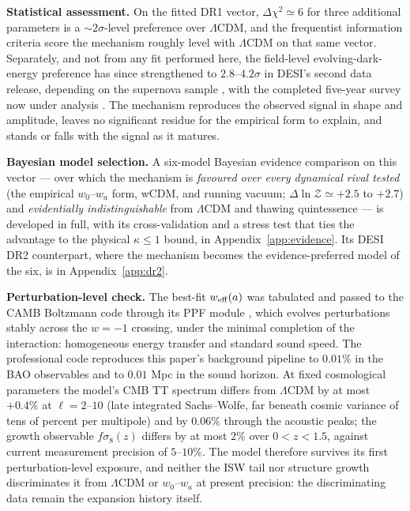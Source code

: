 \documentclass[11pt,a4paper]{article}
\newcommand{\lcdm}{\ensuremath{\Lambda}CDM}
\newcommand{\weff}{w_{\rm eff}}
\begin{document}
\textbf{Statistical assessment.} On the fitted DR1 vector, $\Delta\chi^2\simeq6$ for three additional parameters is a $\sim2\sigma$-level preference over \lcdm{}, and the frequentist information criteria score the mechanism roughly level with \lcdm{} on that same vector. Separately, and not from any fit performed here, the field-level evolving-dark-energy preference has since strengthened to $2.8$--$4.2\sigma$ in DESI's second data release, depending on the supernova sample \citep{DESI_DR2}, with the completed five-year survey now under analysis \citep{DESI_completion}. The mechanism reproduces the observed signal in shape and amplitude, leaves no significant residue for the empirical form to explain, and stands or falls with the signal as it matures.

\textbf{Bayesian model selection.} A six-model Bayesian evidence comparison on this vector --- over which the mechanism is \emph{favoured over every dynamical rival tested} (the empirical $w_0$--$w_a$ form, wCDM, and running vacuum; $\Delta\ln\mathcal{Z}\simeq+2.5$ to $+2.7$) and \emph{evidentially indistinguishable} from \lcdm{} and thawing quintessence --- is developed in full, with its cross-validation and a stress test that ties the advantage to the physical $\kappa\le1$ bound, in Appendix~\ref{app:evidence}. Its DESI DR2 counterpart, where the mechanism becomes the evidence-preferred model of the six, is in Appendix~\ref{app:dr2}.

\textbf{Perturbation-level check.} The best-fit $\weff(a)$ was tabulated and passed to the CAMB Boltzmann code \citep{CAMB} through its PPF module \citep{PPF}, which evolves perturbations stably across the $w=-1$ crossing, under the minimal completion of the interaction: homogeneous energy transfer and standard sound speed. The professional code reproduces this paper's background pipeline to $0.01\%$ in the BAO observables and to $0.01$ Mpc in the sound horizon. At fixed cosmological parameters the model's CMB TT spectrum differs from \lcdm{} by at most $+0.4\%$ at $\ell=2$--$10$ (late integrated Sachs--Wolfe, far beneath cosmic variance of tens of percent per multipole) and by $0.06\%$ through the acoustic peaks; the growth observable $f\sigma_8(z)$ differs by at most $2\%$ over $0<z<1.5$, against current measurement precision of $5$--$10\%$. The model therefore survives its first perturbation-level exposure, and neither the ISW tail nor structure growth discriminates it from \lcdm{} or $w_0$--$w_a$ at present precision: the discriminating data remain the expansion history itself.
\end{document}
